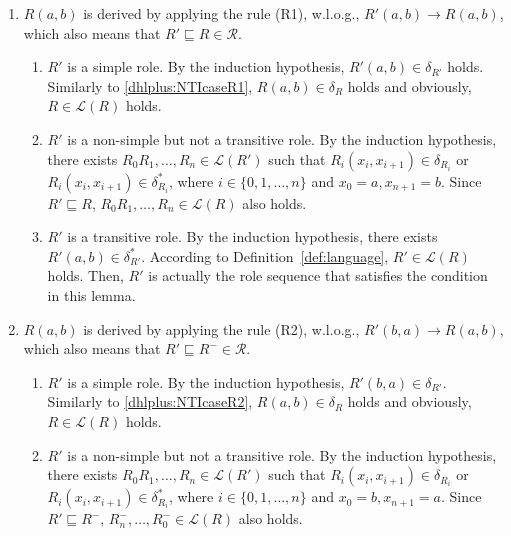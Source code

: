 \begin{enumerate}[leftmargin=12ex,label=Case~3.\arabic*, ref=Case~3.\arabic*]
\item $R(a,b)$ is derived by applying the rule (R1), w.l.o.g., $R'(a,b)\rightarrow R(a,b)$,
    which also means that $R'\sqsubseteq R\in\mathcal{R}$.\label{dhlplus:TIcaseR1}

    \begin{enumerate}[leftmargin=8ex,label=Case~3.1.\arabic*]
    \item $R'$ is a simple role. By the induction hypothesis, $R'(a,b)\in\delta_{R'}$ holds.
        Similarly to \ref{dhlplus:NTIcaseR1}, $R(a,b)\in\delta_{R}$ holds and
        obviously, $R\in\mathcal{L}(R)$ holds.

    \item $R'$ is a non-simple but not a transitive role.
        By the induction hypothesis, there exists $R_0R_1,\ldots ,R_n\in\mathcal{L}(R')$
        such that $R_i(x_i,x_{i+1})\in\delta_{R_i}$ or $R_i(x_i,x_{i+1})\in\delta^*_{R_i}$, where $i\in\{0,1,\ldots ,n\}$
        and $x_0=a, x_{n+1}=b$. Since $R'\sqsubseteq R$, $R_0R_1,\ldots ,R_n\in\mathcal{L}(R)$ also holds.

    \item $R'$ is a transitive role.
        By the induction hypothesis, there exists $R'(a,b)\in\delta^*_{R'}$.
        According to Definition~\ref{def:language}, $R'\in\mathcal{L}(R)$ holds.
        Then, $R'$ is actually the role sequence that satisfies the condition
        in this lemma.
    \end{enumerate}

\item $R(a,b)$ is derived by applying the rule (R2), w.l.o.g., $R'(b,a)\rightarrow R(a,b)$,
    which also means that $R'\sqsubseteq R^-\in\mathcal{R}$.

    \begin{enumerate}[leftmargin=8ex,label=Case~3.2.\arabic*]
    \item $R'$ is a simple role. By the induction hypothesis, $R'(b,a)\in\delta_{R'}$.
        Similarly to \ref{dhlplus:NTIcaseR2}, $R(a,b)\in\delta_{R}$ holds and
        obviously, $R\in\mathcal{L}(R)$ holds.

    \item $R'$ is a non-simple but not a transitive role. By the induction hypothesis, there exists $R_0R_1,\ldots ,R_n\in\mathcal{L}(R')$
        such that $R_i(x_i,x_{i+1})\in\delta_{R_i}$ or $R_i(x_i,x_{i+1})\in\delta^*_{R_i}$, where $i\in\{0,1,\ldots ,n\}$
        and $x_0=b, x_{n+1}=a$. Since $R'\sqsubseteq R^-$, $R_n^-,\ldots ,R_0^-\in\mathcal{L}(R)$ also holds.


\end{enumerate}
\end{enumerate}
